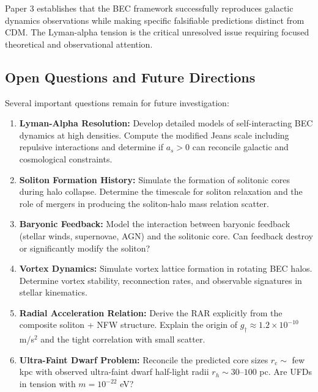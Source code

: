 \documentclass[11pt,a4paper]{article}
\newcommand{\rc}{\ensuremath{r_{\mathrm{c}}}}
\newcommand{\gdagger}{\ensuremath{g_{\dagger}}}
\theoremstyle{definition}
\theoremstyle{remark}
\begin{document}
Paper 3 establishes that the BEC framework successfully reproduces galactic dynamics observations while making specific falsifiable predictions distinct from CDM. The Lyman-alpha tension is the critical unresolved issue requiring focused theoretical and observational attention.

\subsection{Open Questions and Future Directions}
\label{sec:future_directions}

Several important questions remain for future investigation:

\begin{enumerate}[leftmargin=*, itemsep=0.3em]

\item \textbf{Lyman-Alpha Resolution:} Develop detailed models of self-interacting BEC dynamics at high densities. Compute the modified Jeans scale including repulsive interactions and determine if $a_s > 0$ can reconcile galactic and cosmological constraints.

\item \textbf{Soliton Formation History:} Simulate the formation of solitonic cores during halo collapse. Determine the timescale for soliton relaxation and the role of mergers in producing the soliton-halo mass relation scatter.

\item \textbf{Baryonic Feedback:} Model the interaction between baryonic feedback (stellar winds, supernovae, AGN) and the solitonic core. Can feedback destroy or significantly modify the soliton?

\item \textbf{Vortex Dynamics:} Simulate vortex lattice formation in rotating BEC halos. Determine vortex stability, reconnection rates, and observable signatures in stellar kinematics.

\item \textbf{Radial Acceleration Relation:} Derive the RAR explicitly from the composite soliton + NFW structure. Explain the origin of $\gdagger \approx 1.2 \times 10^{-10}$ m/s$^2$ and the tight correlation with small scatter.

\item \textbf{Ultra-Faint Dwarf Problem:} Reconcile the predicted core sizes $\rc \sim$ few kpc with observed ultra-faint dwarf half-light radii $r_h \sim 30$--$100$ pc. Are UFDs in tension with $m = 10^{-22}$ eV?


\end{enumerate}
\end{document}
